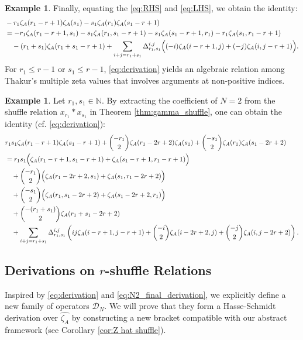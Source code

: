 \documentclass[12pt,reqno]{amsart}
\numberwithin{equation}{section}
\theoremstyle{plain}
\theoremstyle{definition}
\newtheorem{ex}[thm]{Example}
\theoremstyle{remark}
\newcommand{\Dcal}{\mathcal{D}}
\begin{document}
\begin{ex}
Finally, equating the \eqref{eq:RHS} and \eqref{eq:LHS}, we obtain the identity:
\begin{align}
    \notag&-r_1\zeta_A(r_1-r+1)\zeta_A(s_1) - s_1\zeta_A(r_1)\zeta_A(s_1-r+1) \\
    \notag&= -r_1\zeta_A(r_1-r+1,s_1) - s_1\zeta_A(r_1,s_1-r+1) - s_1\zeta_A(s_1-r+1,r_1) - r_1\zeta_A(s_1,r_1-r+1) \\\label{eq:derivation}
    &\quad - (r_1+s_1)\zeta_A(r_1+s_1-r+1) + \sum_{i+j=r_1+s_1}\Delta_{r_1,s_1}^{i,j} \Big( (-i)\zeta_A(i-r+1,j) + (-j)\zeta_A(i,j-r+1) \Big).
\end{align}
For $r_1\leq r-1$ or $s_1 \leq  r-1$, \eqref{eq:derivation} yields an algebraic relation among Thakur's multiple zeta values that involves arguments at non-positive indices.
\end{ex}

\begin{ex}Let $r_1, s_1 \in \mathbb{N}$. By extracting the coefficient of $N=2$ from the shuffle relation $x_{r_1} \ast x_{s_1}$ in Theorem \ref{thm:gamma_shuffle}, one can obtain the identity (cf. \eqref{eq:derivation}):
    \begin{align}
\notag& r_1 s_1 \zeta_A(r_1-r+1)\zeta_A(s_1-r+1) + \binom{-r_1}{2}\zeta_A(r_1-2r+2)\zeta_A(s_1) + \binom{-s_1}{2}\zeta_A(r_1)\zeta_A(s_1-2r+2) \\
\notag&= r_1 s_1 \Big( \zeta_A(r_1-r+1, s_1-r+1) + \zeta_A(s_1-r+1, r_1-r+1) \Big) \\
\notag&\quad + \binom{-r_1}{2} \Big( \zeta_A(r_1-2r+2, s_1) + \zeta_A(s_1, r_1-2r+2) \Big) \\
\notag&\quad + \binom{-s_1}{2} \Big( \zeta_A(r_1, s_1-2r+2) + \zeta_A(s_1-2r+2, r_1) \Big) \\
\notag&\quad + \binom{-(r_1+s_1)}{2} \zeta_A(r_1+s_1-2r+2) \\
\label{eq:N2_final_derivation}&\quad + \sum_{i+j=r_1+s_1} \Delta_{r_1,s_1}^{i,j} \left( i j \zeta_A(i-r+1, j-r+1) + \binom{-i}{2} \zeta_A(i-2r+2, j) + \binom{-j}{2} \zeta_A(i, j-2r+2) \right).
\end{align}
\end{ex}
\subsection{Derivations on \texorpdfstring{$r$}{r}-shuffle Relations}\label{section:4.3}

Inspired by \eqref{eq:derivation} and \eqref{eq:N2_final_derivation}, we explicitly define a new family of operators $\Dcal_N$. We will prove that they form a Hasse-Schmidt derivation over $\widehat{\zeta_A}$ by constructing a new bracket compatible with our abstract framework (see Corollary \ref{cor:Z hat shuffle}).
\end{document}
